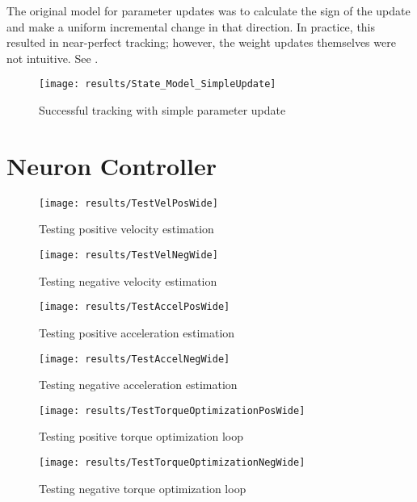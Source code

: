 
The original model for parameter updates was to calculate the sign of the update
and make a uniform incremental change in that direction. In practice, this 
resulted in near-perfect tracking; however, the weight updates themselves were
not intuitive. See .

\begin{figure}
\centering
\texttt{[image: results/State\_Model\_SimpleUpdate]}
\caption{Successful tracking with simple parameter update}
\label{fig:StateUpdateSimple}
\end{figure}

\section{Neuron Controller}


\begin{figure}
\centering
\texttt{[image: results/TestVelPosWide]}
\caption{Testing positive velocity estimation}
\label{fig:TestVelPos}
\end{figure}

\begin{figure}
\centering
\texttt{[image: results/TestVelNegWide]}
\caption{Testing negative velocity estimation}
\label{fig:TestVelNeg}
\end{figure}

\begin{figure}
\centering
\texttt{[image: results/TestAccelPosWide]}
\caption{Testing positive acceleration estimation}
\label{fig:TestAccelPos}
\end{figure}

\begin{figure}
\centering
\texttt{[image: results/TestAccelNegWide]}
\caption{Testing negative acceleration estimation}
\label{fig:TestAccelNeg}
\end{figure}

\begin{figure}
\centering
\texttt{[image: results/TestTorqueOptimizationPosWide]}
\caption{Testing positive torque optimization loop}
\label{fig:TestTorqueOptimizationPos}
\end{figure}

\begin{figure}
\centering
\texttt{[image: results/TestTorqueOptimizationNegWide]}
\caption{Testing negative torque optimization loop}
\label{fig:TestTorqueOptimizationNeg}
\end{figure}

